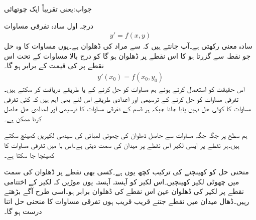 جواب:یعنی تقریباً ایک چوتھائی

درجہ اول سادہ تفرقی مساوات
\begin{align}\label{مساوات_سادہ_اول_ڈھلوان_تفاعل_الف}
y'=f(x,y)
\end{align}
سادہ معنی رکھتی ہے۔آپ جانتے ہیں کہ  سے مراد  کی ڈھلوان ہے۔یوں مساوات  کا وہ حل جو نقطہ  سے گزرتا ہو کا اس نقطے پر ڈھلوان  ہو گا کو درج بالا مساوات کے تحت اس نقطے پر  کی قیمت کے برابر ہو گا۔
\begin{align*}
y'(x_0)=f(x_0,y_0)
\end{align*}
اس حقیقت کو استعمال کرتے ہوئے ہم مساوات  کو حل کرنے کے   یا  طریقے دریافت کر سکتے ہیں۔تفرقی مساوات کو حل کرنے کے ترسیمی اور اعدادی طریقے اس لئے بھی اہم ہیں کہ کئی تفرقی مساوات کا کوئی  حل نہیں پایا جاتا جبکہ ہر قسم کے تفرقی مساوات کا ترسیمی اور اعدادی حل حاصل کرنا ممکن ہے۔   

ہم  سطح پر جگہ جگہ مساوات  سے حاصل ڈھلوان کی چھوٹی لمبائی کی سیدھی لکیریں کھینچ سکتے ہیں۔ہر نقطے پر ایسی لکیر اس نقطے پر میدان کی سمت دیتی ہے۔اس  یا   میں تفرقی مساوات کا   کھینچا جا سکتا ہے۔

منحنی حل کو کھینچنے کی ترکیب کچھ یوں ہے۔کسی بھی نقطے پر ڈھلوان کی سمت میں چھوٹی لکیر کھینچیں۔اس لکیر کو آہستہ آہستہ یوں موڑیں کہ لکیر کے اختتامی نقطے پر لکیر کی ڈھلوان عین اس نقطے کی ڈھلوان برابر ہو۔اسی طرح آگے بڑھتے رہیں۔ڈھال میدان میں نقطے جتنے قریب قریب ہوں تفرقی مساوات کا منحنی حل اتنا درست ہو گا۔

